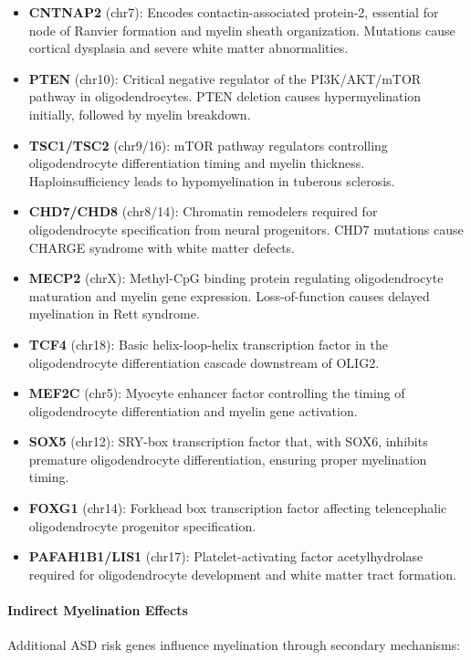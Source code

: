 \documentclass[12pt]{article}
\begin{document}
\begin{itemize}
\item \textbf{CNTNAP2} (chr7): Encodes contactin-associated protein-2, essential for node of Ranvier formation and myelin sheath organization. Mutations cause cortical dysplasia and severe white matter abnormalities.
\item \textbf{PTEN} (chr10): Critical negative regulator of the PI3K/AKT/mTOR pathway in oligodendrocytes. PTEN deletion causes hypermyelination initially, followed by myelin breakdown.
\item \textbf{TSC1/TSC2} (chr9/16): mTOR pathway regulators controlling oligodendrocyte differentiation timing and myelin thickness. Haploinsufficiency leads to hypomyelination in tuberous sclerosis.
\item \textbf{CHD7/CHD8} (chr8/14): Chromatin remodelers required for oligodendrocyte specification from neural progenitors. CHD7 mutations cause CHARGE syndrome with white matter defects.
\item \textbf{MECP2} (chrX): Methyl-CpG binding protein regulating oligodendrocyte maturation and myelin gene expression. Loss-of-function causes delayed myelination in Rett syndrome.
\item \textbf{TCF4} (chr18): Basic helix-loop-helix transcription factor in the oligodendrocyte differentiation cascade downstream of OLIG2.
\item \textbf{MEF2C} (chr5): Myocyte enhancer factor controlling the timing of oligodendrocyte differentiation and myelin gene activation.
\item \textbf{SOX5} (chr12): SRY-box transcription factor that, with SOX6, inhibits premature oligodendrocyte differentiation, ensuring proper myelination timing.
\item \textbf{FOXG1} (chr14): Forkhead box transcription factor affecting telencephalic oligodendrocyte progenitor specification.
\item \textbf{PAFAH1B1/LIS1} (chr17): Platelet-activating factor acetylhydrolase required for oligodendrocyte development and white matter tract formation.
\end{itemize}

\paragraph{Indirect Myelination Effects}
Additional ASD risk genes influence myelination through secondary mechanisms:
\end{document}
